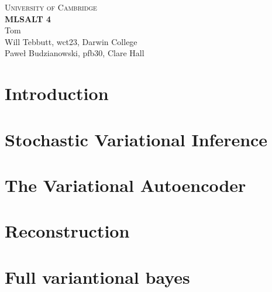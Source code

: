 \documentclass[10pt,a4paper]{article}
\begin{document}
\begin{center}
\Large{\textsc{
University of Cambridge}}\\
\vspace{.5cm}
\large\textbf{MLSALT 4}\\
\vspace{.5cm}
\large{Tom}\\
\large{Will Tebbutt, wct23, Darwin College}\\
\large{Paweł Budzianowski, pfb30, Clare Hall}\\
\end{center} 

\section{Introduction}


\section{Stochastic Variational Inference}


\section{The Variational Autoencoder}


\section{Reconstruction}


\section{Full variantional bayes}







\end{document}
